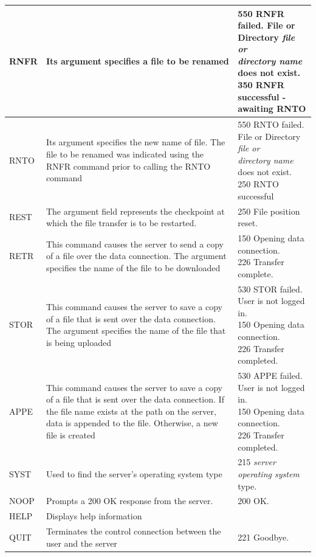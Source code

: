 \documentclass[10pt,twocolumn]{witseiepaper}
\begin{document}
\begin{appendix}
\begin{longtable}{|p{2cm}|p{7cm}|p{7cm}|}
	\hline 
RNFR	& Its argument specifies a file to be renamed & \makecell[l]{550 RNFR failed. File or Directory \textit{file or}\\ \textit{directory name} does not exist. \\350 RNFR successful - awaiting RNTO}\\ 
	\hline 
RNTO	& Its argument specifies the new name of file. The file to be renamed was indicated using the RNFR command prior to calling the RNTO command & \makecell[l]{550 RNTO failed. File or Directory \textit{file or}\\ \textit{directory name} does not exist. \\250 RNTO successful}\\ 
	\hline 
REST	& The argument field represents the checkpoint at which the file transfer is to be restarted.  & 250 File position reset. \\ 
	\hline 
RETR	& This command causes the server to send a copy of a file over the data connection. The argument specifies the name of the file to be downloaded &  \makecell[l]{150 Opening data connection. \\226 Transfer complete.} \\ 
	\hline 
STOR	& This command causes the server to save a copy of a file that is sent over the data connection. The argument specifies the name of the file that is being uploaded &  \makecell[l]{530 STOR failed. User is not logged in. \\150 Opening data connection. \\226 Transfer completed.} \\ 
	\hline 
APPE	& This command causes the server to save a copy of a file that is sent over the data connection. If the file name exists at the path on the server, data is appended to the file. Otherwise, a new file is created &  \makecell[l]{530 APPE failed. User is not logged in. \\150 Opening data connection. \\226 Transfer completed.}\\ 
	\hline 
SYST	& Used to find the server's operating system type & 215 \textit{server operating system} type. \\ 
	\hline 
NOOP	& Prompts a 200 OK response from the server. & 200 OK. \\ 
	\hline 
HELP	& Displays help information &  \\ 
	\hline 
QUIT	& Terminates the control connection between the user and the server &  221 Goodbye.\\ 
	\hline 


\end{longtable}
\end{appendix}
\end{document}
